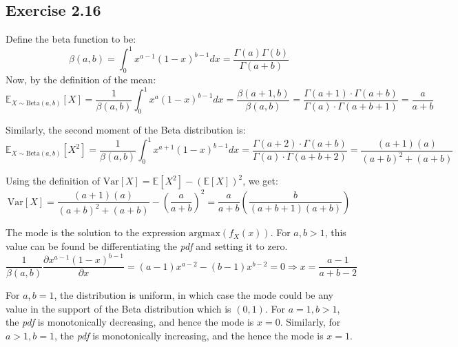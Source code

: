 \documentclass{article}
\begin{document}
\subsection*{Exercise 2.16}
\begin{flushleft}
Define the beta function to be:
\begin{equation}
\beta(a, b) = \int_{0}^{1} x^{a - 1} (1 - x)^{b - 1} dx = \frac{\Gamma(a) \Gamma(b)}{\Gamma(a + b)}
\end{equation}
Now, by the definition of the mean:
\begin{equation}
\mathbb{E}_{X \sim \text{Beta}(a, b)}[X] = \frac{1}{\beta(a, b)}\int_{0}^{1} x^{a} (1 - x)^{b - 1} dx = \frac{\beta(a + 1, b)}{\beta(a, b)} = \frac{\Gamma(a + 1) \cdot \Gamma(a + b)}{\Gamma(a) \cdot \Gamma(a + b + 1)} = \frac{a}{a + b}
\end{equation}

Similarly, the second moment of the Beta distribution is:
\begin{equation}
\mathbb{E}_{X \sim \text{Beta}(a, b)}[X^2] = \frac{1}{\beta(a, b)}\int_{0}^{1} x^{a + 1} (1 - x)^{b - 1} dx = \frac{\Gamma(a + 2) \cdot \Gamma(a + b)}{\Gamma(a) \cdot \Gamma(a + b + 2)} = \frac{(a + 1)(a)}{(a + b)^2 + (a + b)}
\end{equation}

Using the definition of \(\text{Var}[X] = \mathbb{E}[X^2] - (\mathbb{E}[X])^2\), we get:
\begin{equation}
\text{Var}[X] = \frac{(a + 1)(a)}{(a + b)^2 + (a + b)} - \left(\frac{a}{a + b}\right)^2 = \frac{a}{a + b}\left(\frac{b}{(a + b + 1)(a + b)}\right)
\end{equation}

The mode is the solution to the expression \(\mathrm{argmax}(f_{X}(x))\). For \(a, b > 1\), this value can be found be differentiating the \emph{pdf} and setting it to zero.
\begin{equation}
\frac{1}{\beta(a, b)}\frac{\partial x^{a - 1} (1 - x)^{b - 1}}{\partial x} = (a - 1) x^{a - 2} - (b - 1) x^{b - 2} = 0 \Rightarrow x = \frac{a - 1}{a + b - 2}
\end{equation}

For \(a, b = 1\), the distribution is uniform, in which case the mode could be any value in the support of the Beta distribution which is \((0, 1)\). For \(a = 1, b > 1\), the \emph{pdf} is monotonically decreasing, and hence the mode is \(x = 0\). Similarly, for \(a > 1, b = 1\), the \emph{pdf} is monotonically increasing, and the hence the mode is \(x = 1\).
\end{flushleft}
\end{document}
